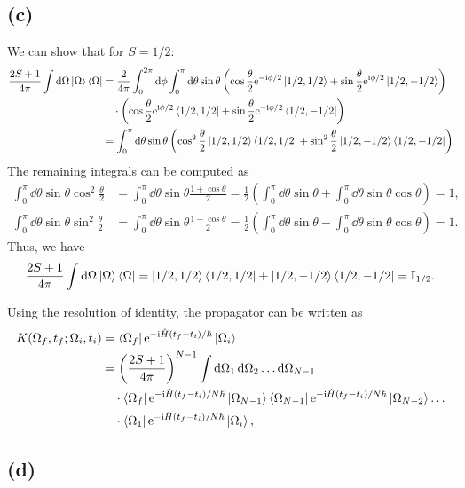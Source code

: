 \documentclass{article}
\newcommand{\ii}{\mathrm{i}}
\newcommand{\me}{\mathrm{e}}
\begin{document}
\subsection*{(c)}
We can show that for $S=1/2$:
\begin{equation}
    \begin{split}
        \frac{2S+1}{4\pi}\int \dd{\Omega}\ket{\Omega}\bra{\Omega}&=\frac{2}{4\pi}\int_0^{2\pi}\dd{\phi}\int_0^{\pi}\dd{\theta}\sin{\theta}\left(\cos\frac{\theta}{2}\me^{-\ii\phi/2}\ket{1/2,1/2}+\sin\frac{\theta}{2}\me^{\ii\phi/2}\ket{1/2,-1/2}\right)\\
        &\quad \cdot \left(\cos\frac{\theta}{2}\me^{\ii\phi/2}\bra{1/2,1/2}+\sin\frac{\theta}{2}\me^{-\ii\phi/2}\bra{1/2,-1/2}\right)\\
        &=\int_0^{\pi}\dd{\theta}\sin{\theta}\left(\cos^2\frac{\theta}{2}\ket{1/2,1/2}\bra{1/2,1/2}+\sin^2\frac{\theta}{2}\ket{1/2,-1/2}\bra{1/2,-1/2}\right)
    \end{split}
\end{equation}
The remaining integrals can be computed as
\begin{subequations}
    \begin{align}
        \int_0^{\pi}\dd{\theta}\sin{\theta}\cos^2\frac{\theta}{2}&=\int_0^{\pi}\dd{\theta}\sin{\theta}\frac{1+\cos{\theta}}{2}=\frac{1}{2}\left(\int_0^{\pi}\dd{\theta}\sin{\theta}+\int_0^{\pi}\dd{\theta}\sin{\theta}\cos{\theta}\right)=1,\\
        \int_0^{\pi}\dd{\theta}\sin{\theta}\sin^2\frac{\theta}{2}&=\int_0^{\pi}\dd{\theta}\sin{\theta}\frac{1-\cos{\theta}}{2}=\frac{1}{2}\left(\int_0^{\pi}\dd{\theta}\sin{\theta}-\int_0^{\pi}\dd{\theta}\sin{\theta}\cos{\theta}\right)=1.
    \end{align}
\end{subequations}
Thus, we have
\begin{equation}
    \frac{2S+1}{4\pi}\int \dd{\Omega}\ket{\Omega}\bra{\Omega}=\ket{1/2,1/2}\bra{1/2,1/2}+\ket{1/2,-1/2}\bra{1/2,-1/2}=\mathbb{I}_{1/2}.
\end{equation}

Using the resolution of identity, the propagator can be written as
\begin{equation}
    \begin{split}
        K(\Omega_f,t_f;\Omega_i,t_i)&=\bra{\Omega_f}\me^{-\ii \hat{H}(t_f-t_i)/\hbar}\ket{\Omega_i}\\
                                    &=\left(\frac{2S+1}{4\pi}\right)^{N-1}\int \dd{\Omega_1}\dd{\Omega_2}\dots\dd{\Omega_{N-1}}\\
        &\quad \cdot \bra{\Omega_f}\me^{-\ii \hat{H}(t_f-t_i)/N\hbar}\ket{\Omega_{N-1}}\bra{\Omega_{N-1}}\me^{-\ii \hat{H}(t_f-t_i)/N\hbar}\ket{\Omega_{N-2}}\dots\\
        &\quad \cdot \bra{\Omega_1}\me^{-\ii \hat{H}(t_f-t_i)/N\hbar}\ket{\Omega_i},
    \end{split}
\end{equation}

\subsection*{(d)}



%
%
\end{document}
